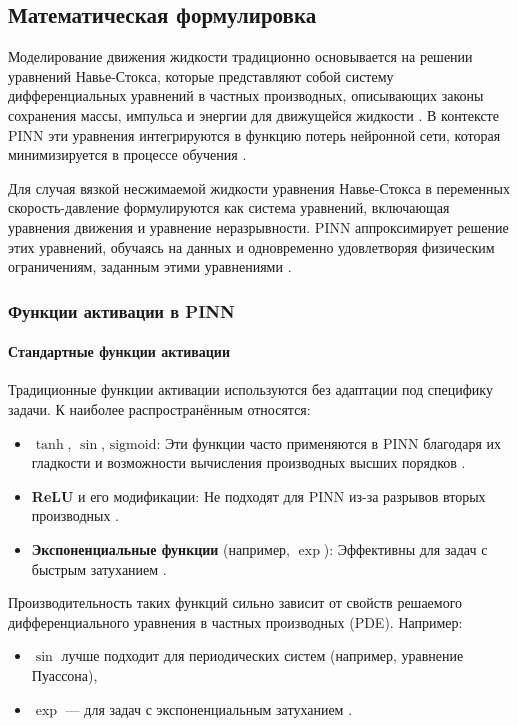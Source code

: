 \subsection{Математическая формулировка}
Моделирование движения жидкости традиционно основывается на решении уравнений Навье-Стокса, которые
представляют собой систему дифференциальных уравнений в частных производных, описывающих законы сохранения
массы, импульса и энергии для движущейся жидкости \cite{batchelor2000introduction}. В контексте PINN эти
уравнения интегрируются в функцию потерь нейронной сети, которая минимизируется в процессе
обучения \cite{yang2019adversarial}.

Для случая вязкой несжимаемой жидкости уравнения Навье-Стокса в переменных скорость-давление формулируются
как система уравнений, включающая уравнения движения и уравнение неразрывности. PINN аппроксимирует
решение этих уравнений, обучаясь на данных и одновременно удовлетворяя физическим ограничениям, заданным
этими уравнениями \cite{jin2021nsfnets}.

\subsubsection{Функции активации в PINN}

\paragraph{Стандартные функции активации}
Традиционные функции активации используются без адаптации под специфику задачи. К наиболее распространённым относятся:
\begin{itemize}
    \item \textbf{$\tanh$}, \textbf{$\sin$}, \textbf{$\mathrm{sigmoid}$}: Эти функции часто применяются в PINN благодаря их гладкости и возможности вычисления производных высших порядков \cite{0d752c79fb816703274a3d37f85a85689a2a9405}\cite{Sutfeld2018-io}.
    \item \textbf{ReLU} и его модификации: Не подходят для PINN из-за разрывов вторых производных \cite{fe520ccac2a6bd50f75a4a34022fe54116871013}.
    \item \textbf{Экспоненциальные функции} (например, $\exp$): Эффективны для задач с быстрым затуханием \cite{7fcd4b3c875d8e41eb0c184aa1a42bf4c8906d61}.
\end{itemize}

Производительность таких функций сильно зависит от свойств решаемого дифференциального уравнения в частных производных (PDE). Например:
\begin{itemize}
    \item $\sin$ лучше подходит для периодических систем (например, уравнение Пуассона),
    \item $\exp$ — для задач с экспоненциальным затуханием \cite{fe520ccac2a6bd50f75a4a34022fe54116871013}.
\end{itemize}

